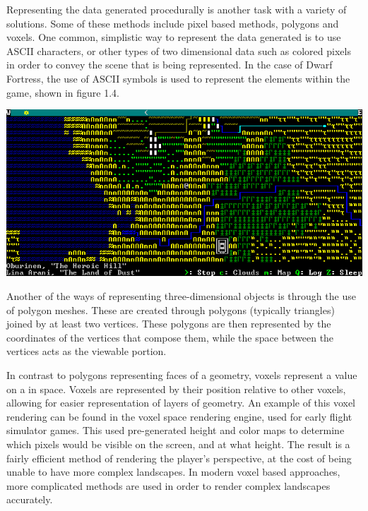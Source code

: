 \documentclass[10pt]{report}
\begin{document}
		Representing the data generated procedurally is another task with a variety of solutions. Some of these methods include pixel based methods, polygons and voxels. One common, simplistic way to represent the data generated is to use ASCII characters, or other types of two dimensional data such as colored pixels in order to convey the scene that is being represented. In the case of Dwarf Fortress, the use of ASCII symbols is used to represent the elements within the game, shown in figure 1.4.
		
		\begin{minipage}{\textwidth}
			\centering
			\includegraphics[scale=.5]{dwarf_fortress}
			\label{fig:fig13}
		\end{minipage}
		
		Another of the ways of representing three-dimensional objects is through the use of polygon meshes. These are created through polygons (typically triangles) joined by at least two vertices. These polygons are then represented by the coordinates of the vertices that compose them, while the space between the vertices acts as the viewable portion.
		
		In contrast to polygons representing faces of a geometry, voxels represent a value on a in space. Voxels are represented by their position relative to other voxels, allowing for easier representation of layers of geometry. An example of this voxel rendering can be found in the voxel space rendering engine, used for early flight simulator games. This used pre-generated height and color maps to determine which pixels would be visible on the screen, and at what height. The result is a fairly efficient method of rendering the player's perspective, at the cost of being unable to have more complex landscapes. In modern voxel based approaches, more complicated methods are used in order to render complex landscapes accurately.
		
\end{document}
